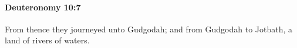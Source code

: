 
		\paragraph{Deuteronomy 10:7} %
			\label{DEUTERONOMY-10-7}

			From thence they journeyed unto Gudgodah; and from Gudgodah to Jotbath, a land of rivers of waters.


